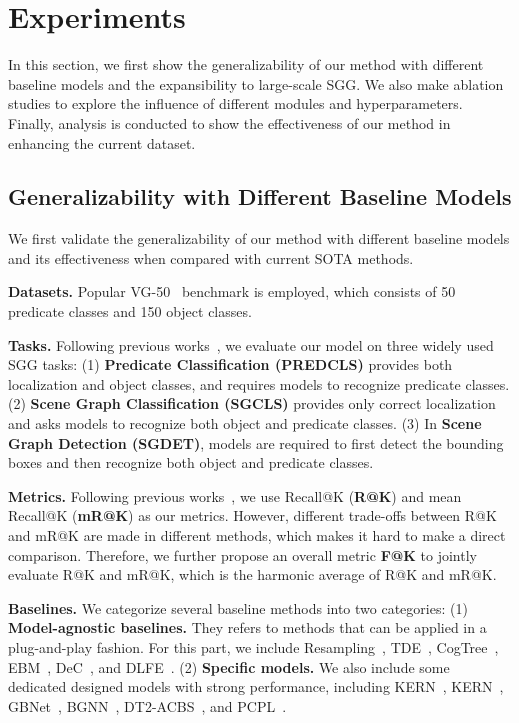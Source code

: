 \documentclass[runningheads]{llncs}
\begin{document}
\section{Experiments}
In this section, we first show the generalizability of our method with different baseline models and the expansibility to large-scale SGG. 
We also make ablation studies to explore the influence of different modules and hyperparameters.
Finally, analysis is conducted to show the effectiveness of our method in enhancing the current dataset.

\subsection{Generalizability with Different Baseline Models}
We first validate the generalizability of our method with different baseline models and its effectiveness when compared with current SOTA methods.

\smallskip
\noindent
\textbf{Datasets.} Popular VG-50~\cite{xu2017scene} benchmark is employed, which consists of 50 predicate classes and 150 object classes.

\smallskip
\noindent
\textbf{Tasks.}
Following previous works~\cite{xu2017scene,tang2020unbiased,zellers2018motif}, we evaluate our model on three widely used SGG tasks:
(1) \textbf{Predicate Classification (PREDCLS)} provides both localization and object classes, and requires models to recognize predicate classes.
(2) \textbf{Scene Graph Classification (SGCLS)} provides only correct localization and asks models to recognize both object and predicate classes.
(3) In \textbf{Scene Graph Detection (SGDET)}, models are required to first detect the bounding boxes and then recognize both object and predicate classes.

\smallskip
\noindent
\textbf{Metrics.}
Following previous works~\cite{yu2020cogtree,tang2019learning}, we use Recall@K (\textbf{R@K}) and mean Recall@K (\textbf{mR@K}) as our metrics.
However, different trade-offs between R@K and mR@K are made in
different methods, which makes it hard to make a direct comparison.
Therefore, we further propose an overall metric \textbf{F@K} to jointly evaluate R@K and
mR@K, which is the harmonic average of R@K and mR@K.

\smallskip
\noindent
\textbf{Baselines.}
We categorize several baseline methods into two categories:
(1) \textbf{Model-agnostic baselines.} They refers to methods that can be applied in a plug-and-play fashion. For this part, we include Resampling~\cite{li2021bipartite},  TDE~\cite{tang2020unbiased}, CogTree~\cite{yu2020cogtree}, EBM~\cite{ebm2021energy}, DeC~\cite{dec2021semantic}, and DLFE~\cite{dlfe2021recovering}.
(2) \textbf{Specific models.} We also include some dedicated designed models with strong performance, including KERN~\cite{kern2019knowledge}, KERN~\cite{kern2019knowledge}, GBNet~\cite{gbnet2020bridging}, BGNN~\cite{li2021bipartite}, DT2-ACBS~\cite{desai2021learning}, and PCPL~\cite{yan2020pcpl}.
\end{document}
